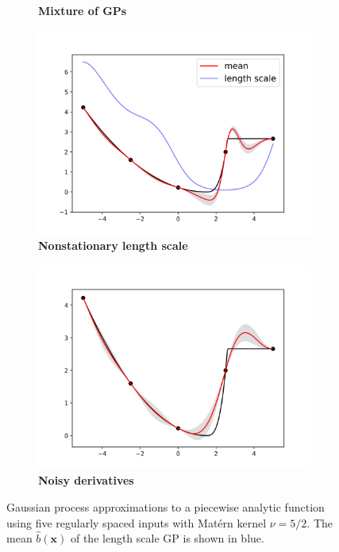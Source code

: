 \documentclass{article}
\renewcommand{\vec}[1]{\mathbf{#1}}
\begin{document}
\begin{figure}
\begin{subfigure}[b]{.4\textwidth}
      \caption{\textbf{Mixture of GPs}}
    \end{subfigure}
    \begin{subfigure}[b]{.4\textwidth}
      \centering
      \includegraphics[scale=0.35]{figures/kink-length.png}
      \caption{\textbf{Nonstationary length scale}}
    \end{subfigure}%
    \begin{subfigure}[b]{.4\textwidth}
      \centering
      \includegraphics[scale=0.35]{figures/kink-noisy.png}
      \caption{\textbf{Noisy derivatives}}
    \end{subfigure}
		\caption{Gaussian process approximations to a piecewise analytic function using five regularly spaced inputs with Mat\'ern kernel $\nu = 5/2$. The mean $\hat{b}(\vec{x})$ of the length scale GP is shown in blue.}
		\label{nonstationary}
\end{figure}
\end{document}
